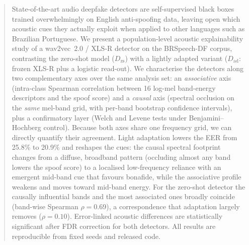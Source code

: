\documentclass[sigconf]{acmart}
\begin{document}
\begin{abstract}
State-of-the-art audio deepfake detectors are self-supervised black boxes trained
overwhelmingly on English anti-spoofing data, leaving open which acoustic cues they
actually exploit when applied to other languages such as Brazilian Portuguese. We
present a population-level acoustic explainability study of a wav2vec~2.0 / XLS-R
detector on the BRSpeech-DF corpus, contrasting the zero-shot model
($D_\mathrm{zs}$) with a lightly adapted variant ($D_\mathrm{ad}$: frozen XLS-R
plus a logistic read-out). We characterise the detectors along two complementary
axes over the same analysis set: an \emph{associative} axis (intra-class Spearman
correlation between 16 log-mel band-energy descriptors and the spoof score) and a
\emph{causal} axis (spectral occlusion on the \emph{same} mel-band grid, with
per-band bootstrap confidence intervals), plus a confirmatory layer (Welch and
Levene tests under Benjamini--Hochberg control). Because both axes share one
frequency grid, we can directly quantify their agreement. Light adaptation lowers
the EER from 25.8\% to 20.9\% and reshapes the cues: the causal spectral footprint
changes from a diffuse, broadband pattern (occluding almost any band lowers the
spoof score) to a localised low-frequency reliance with an emergent mid-band cue
that favours bonafide, while the associative profile weakens and moves toward
mid-band energy. For the zero-shot detector the causally influential bands and the
most associated ones broadly coincide (band-wise Spearman $\rho=0.69$), a
correspondence that adaptation largely removes ($\rho=0.10$). Error-linked acoustic
differences are statistically significant after FDR correction for both detectors.
All results are reproducible from fixed seeds and released code.
\end{abstract}
\end{document}
